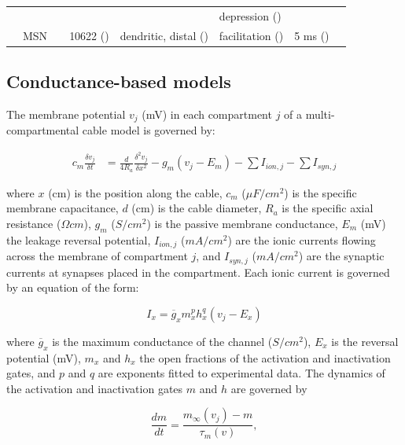 \begin{table}
\begin{adjustbox}{width=\textwidth}
\begin{tabular}{p{0.05\textheight}p{0.05\textheight}p{0.10\textheight}p{0.15\textheight}p{0.15\textheight}p{0.15\textheight}p{0.15\textheight}p{0.15\textheight}}
 &  &  &  &  & depression (\cite{hanson_short-term_2002}) &  &  \\
 & MSN &  & 10622 (\cite{kita_organization_2016}) & dendritic, distal (\cite{chan_hcn2_2004}) & facilitation (\cite{miguelez_altered_2012}) & 5 ms (\cite{kita_intracellular_1991}) & \\
 \bottomrule
\end{tabular}
\end{adjustbox}
%
%
\label{tab:conn_data}
\end{table}

%
%
\subsection{Conductance-based models}

The membrane potential $v_j$ (mV) in each compartment $j$ of a multi-compartmental cable model is governed by:

%
\begin{align}
    c_m \frac{ \delta v_{j} }{ \delta t } &= \frac{d}{4 R_a} \frac{ \delta^2 v_j }{ \delta x^2 } - g_m (v_j - E_m) - \sum I_{ion,j} - \sum I_{syn,j}
\end{align}

%
%
%
%
%
%

where $x$ (cm) is the position along the cable, $c_m$ ($ \mu F / cm^2 $) is the specific membrane capacitance, $d$ (cm) is the cable diameter, $R_a$ is the specific axial resistance ($\Omega cm$), $g_m$ ($S / cm^2$) is the passive membrane conductance, $E_m$ (mV) the leakage reversal potential, $I_{ion,j}$ ($mA / cm^2$) are the ionic currents flowing across the membrane of compartment $j$, and $I_{syn,j}$ ($mA / cm^2$) are the synaptic currents at synapses placed in the compartment.
Each ionic current is governed by an equation of the form:

\begin{equation}
    I_x = \overline{g}_x m_x^p h_x^q (v_j - E_x)
\end{equation}

where $\overline{g}_x$ is the maximum conductance of the channel ($S/cm^2$), $E_x$ is the reversal potential (mV), $m_x$ and $h_x$ the open fractions of the activation and inactivation gates, and $p$ and $q$ are exponents fitted to experimental data. The dynamics of the activation and inactivation gates $m$ and $h$ are governed by

\begin{equation}
    \frac{dm}{dt} = \frac{ m_{ \infty } (v_j) - m }{ \tau_{ m } (v) } ,
\end{equation}

